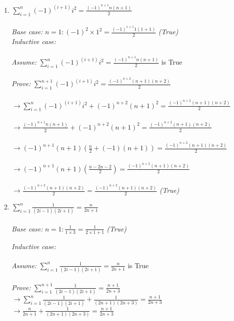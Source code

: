 \documentclass[[11pts]{report}
\begin{document}
\begin{enumerate}
\begin{enumerate}
\item $\sum_{i=1}^{n}(-1)^{(i+1)}i^2 = \frac{(-1)^{n+1}n(n+1)}{2}$
\\ \\
\textit{Base case:} 
$n=1: (-1)^2\times1^2 = \frac{(-1)^{1+1}1(1+1)}{2}$ \textit{(True)} \\
\textit{Inductive case:} \\ \\
\textit{Assume:} $\sum_{i=1}^{n}(-1)^{(i+1)}i^2 = \frac{(-1)^{n+1}n(n+1)}{2}$ is True
\\ \\ \textit{Prove:} $\sum_{i=1}^{n+1}(-1)^{(i+1)}i^2 = \frac{(-1)^{n+2}(n+1)(n+2)}{2}$
 \\ \\ $\to \sum_{i=1}^{n}(-1)^{(i+1)}i^2 + (-1)^{n+2}(n+1)^2 =  \frac{(-1)^{n+2}(n+1)(n+2)}{2} $ 
\\ \\ $\to \frac{(-1)^{n+1}n(n+1)}{2} + (-1)^{n+2}(n+1)^2 =  \frac{(-1)^{n+2}(n+1)(n+2)}{2} $ 
\\ \\  $\to (-1)^{n+1}(n+1)(\frac{n}{2} + (-1)(n+1)) = \frac{(-1)^{n+2}(n+1)(n+2)}{2} $ 
\\ \\  $\to (-1)^{n+1}(n+1)(\frac{n-2n-2}{2}) = \frac{(-1)^{n+2}(n+1)(n+2)}{2} $
\\ \\ $\to  \frac{(-1)^{n+2}(n+1)(n+2)}{2} = \frac{(-1)^{n+2}(n+1)(n+2)}{2} $ \textit{(True)}

\item $\sum_{i=1}^{n}\frac{1}{(2i-1)(2i+1)} = \frac{n}{2n+1}$
\\ \\
\textit{Base case:} $n = 1: \frac{1}{1\times3} = \frac{1}{2\times1 + 1}$ \textit{(True)}

\textit{Inductive case:}
\\ \\
\textit{Assume:} $\sum_{i=1}^{n}\frac{1}{(2i-1)(2i+1)} = \frac{n}{2n+1}$ is True
\\ \\
\textit{Prove:} $\sum_{i=1}^{n+1}\frac{1}{(2i-1)(2i+1)} = \frac{n+1}{2n+3}$ \\

$\to \sum_{i=1}^{n}\frac{1}{(2i-1)(2i+1)} + \frac{1}{(2n+1)(2n+3)} = \frac{n+1}{2n+3}$ \\

$\to \frac{n}{2n+1} + \frac{1}{(2n+1)(2n+3)} = \frac{n+1}{2n+3}$ \\


\end{enumerate}
\end{enumerate}
\end{document}
